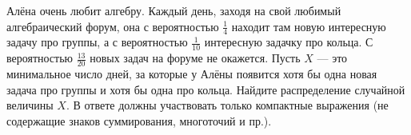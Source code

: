 \documentclass{article}
\begin{document}
Алёна очень любит алгебру. Каждый день, заходя на свой любимый алгебраический форум, она с вероятностью $\frac14$ 
находит там новую интересную задачу про группы, а с вероятностью $\frac{1}{10}$ интересную задачку про кольца. 
С вероятностью $\frac{13}{20}$ новых задач на форуме не окажется. Пусть $X$ --- это минимальное число дней, за
которые у Алёны появится хотя бы одна новая задача про группы и хотя бы одна про кольца. Найдите распределение 
случайной величины $X$. В ответе должны участвовать только компактные выражения (не содержащие знаков суммирования,
многоточий и пр.).
\end{document}
